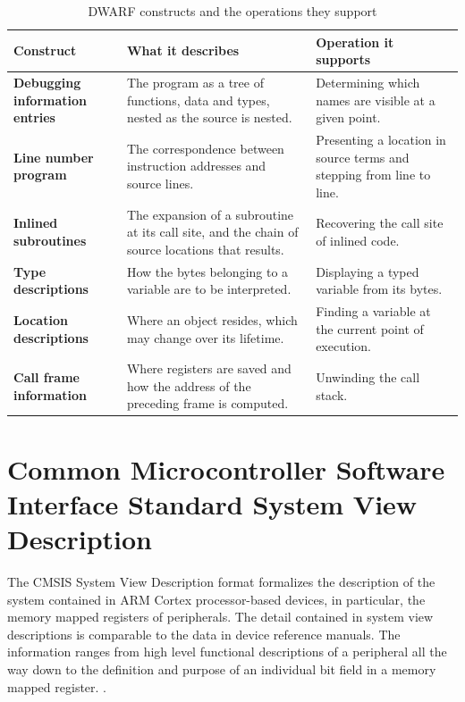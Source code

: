 \begin{table}[H]
    \centering
    \caption{DWARF constructs and the operations they support}
    \label{tab:dwarf}
    \begin{tabularx}{\linewidth}{| @{}>{\hsize\bfseries}Y | >{\hsize}Y | >{\hsize}Y@{} |}
        \hline
        Construct & \textbf{What it describes} & \textbf{Operation it supports} \\
        \hline
        Debugging information entries & The program as a tree of functions, data and types, nested as the source is nested. & Determining which names are visible at a given point. \\
        \hline
        Line number program & The correspondence between instruction addresses and source lines. & Presenting a location in source terms and stepping from line to line. \\
        \hline
        Inlined subroutines & The expansion of a subroutine at its call site, and the chain of source locations that results. & Recovering the call site of inlined code. \\
        \hline
        Type descriptions & How the bytes belonging to a variable are to be interpreted. & Displaying a typed variable from its bytes. \\
        \hline
        Location descriptions & Where an object resides, which may change over its lifetime. & Finding a variable at the current point of execution. \\
        \hline
        Call frame information & Where registers are saved and how the address of the preceding frame is computed. & Unwinding the call stack. \\
        \hline
    \end{tabularx}
\end{table}

\section{Common Microcontroller Software Interface Standard System View Description}
The CMSIS System View Description format formalizes the description of the system contained in ARM Cortex processor-based devices, in particular, the memory mapped registers of peripherals. The detail contained in system view descriptions is comparable to the data in device reference manuals. The information ranges from high level functional descriptions of a peripheral all the way down to the definition and purpose of an individual bit field in a memory mapped register. \cite{cmsis_svd}.

